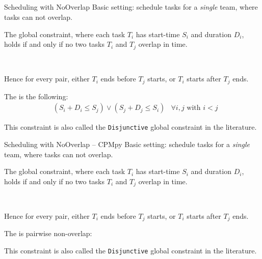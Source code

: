 \documentclass{cons-beamer}
\begin{document}
\subsection{}

\begin{frame}{Scheduling with NoOverlap}
	Basic setting: schedule tasks for a \textit{single} team, where tasks can not overlap.
	\vfill
	
	\begin{definition}[Carlier, 1982]
		The  global constraint, where each task $T_i$ has start-time $S_i$ and duration $D_i$, holds if and only if no two tasks $T_i$ and $T_j$ overlap in time.
		
		$ $
		
		Hence for every pair, either $T_i$ ends before $T_j$ starts, or $T_i$ starts after $T_j$ ends.
	\end{definition}
	\vfill
	
	The  is the following:
	\begin{align*}
		& ( S_i + D_i \leq S_j ) \vee ( S_j + D_j \leq S_i ) &\forall i, j \text{ with } i < j
	\end{align*}
	\vfill
	
	This constraint is also called the \texttt{Disjunctive} global constraint in the literature.
\end{frame}

\begin{flashcardcpmpy}
\begin{frame}{Scheduling with NoOverlap -- CPMpy}
	Basic setting: schedule tasks for a \textit{single} team, where tasks can not overlap.
	\vfill
	
	\begin{definition}[Carlier, 1982]
		The  global constraint, where each task $T_i$ has start-time $S_i$ and duration $D_i$, holds if and only if no two tasks $T_i$ and $T_j$ overlap in time.
		
		$ $
		
		Hence for every pair, either $T_i$ ends before $T_j$ starts, or $T_i$ starts after $T_j$ ends.
	\end{definition}
	\vfill
	
	The  is pairwise non-overlap:
	\vfill
		\\
		\quad {}
	\vfill
	
	This constraint is also called the \texttt{Disjunctive} global constraint in the literature.
\end{frame}
\end{flashcardcpmpy}
\end{document}
